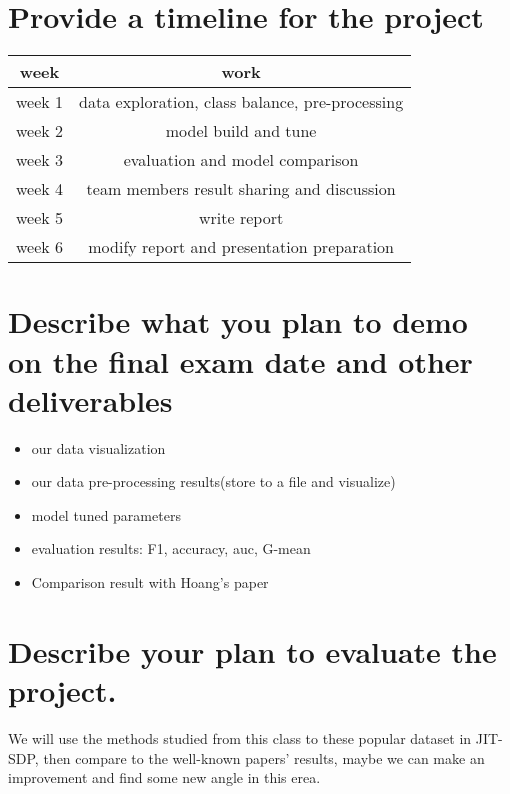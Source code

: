 \documentclass{article}
\begin{document}
\section{Provide a timeline for the project}
\begin{center}
	\begin{tabular}{ c c  }
		week & work \\ 
		\hline
		week 1 & data exploration, class balance, pre-processing \\ 
		week 2 & model build and tune \\  
		week 3 & evaluation and model comparison \\
		week 4 & team members result sharing and discussion   \\
		week 5 & write report  \\ 
		week 6 & modify report and presentation preparation  \\
		\hline
	\end{tabular}
\end{center}

\section{Describe what you plan to demo on the final exam date and other deliverables}
\begin{itemize}
	\item our data visualization 
	\item our data pre-processing results(store to a file and visualize)
	\item model tuned parameters
	\item evaluation results: F1, accuracy, auc, G-mean
	\item Comparison result with Hoang's paper~\cite{hoang2019deepjit}
\end{itemize}

\section{Describe your plan to evaluate the project.}
We will use the methods studied from this class to these popular dataset in JIT-SDP, then compare to the well-known papers' results, maybe we can make an improvement and find some new angle in this erea.















\medskip



\end{document}
